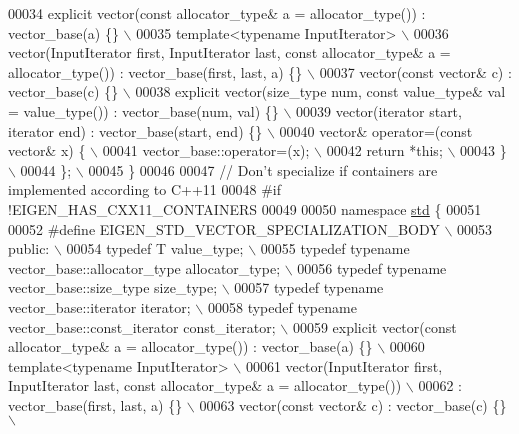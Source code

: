 \begin{DoxyCode}
00034 \textcolor{preprocessor}{    explicit vector(const allocator\_type& a = allocator\_type()) : vector\_base(a) \{\}  \(\backslash\)}
00035 \textcolor{preprocessor}{    template<typename InputIterator> \(\backslash\)}
00036 \textcolor{preprocessor}{    vector(InputIterator first, InputIterator last, const allocator\_type& a = allocator\_type()) :
       vector\_base(first, last, a) \{\} \(\backslash\)}
00037 \textcolor{preprocessor}{    vector(const vector& c) : vector\_base(c) \{\}  \(\backslash\)}
00038 \textcolor{preprocessor}{    explicit vector(size\_type num, const value\_type& val = value\_type()) : vector\_base(num, val) \{\} \(\backslash\)}
00039 \textcolor{preprocessor}{    vector(iterator start, iterator end) : vector\_base(start, end) \{\}  \(\backslash\)}
00040 \textcolor{preprocessor}{    vector& operator=(const vector& x) \{  \(\backslash\)}
00041 \textcolor{preprocessor}{      vector\_base::operator=(x);  \(\backslash\)}
00042 \textcolor{preprocessor}{      return *this;  \(\backslash\)}
00043 \textcolor{preprocessor}{    \} \(\backslash\)}
00044 \textcolor{preprocessor}{  \}; \(\backslash\)}
00045 \textcolor{preprocessor}{\}}
00046 
00047 \textcolor{comment}{// Don't specialize if containers are implemented according to C++11}
00048 \textcolor{preprocessor}{#if !EIGEN\_HAS\_CXX11\_CONTAINERS}
00049 
00050 \textcolor{keyword}{namespace }\hyperlink{namespacestd}{std} \{
00051 
00052 \textcolor{preprocessor}{#define EIGEN\_STD\_VECTOR\_SPECIALIZATION\_BODY \(\backslash\)}
00053 \textcolor{preprocessor}{  public:  \(\backslash\)}
00054 \textcolor{preprocessor}{    typedef T value\_type; \(\backslash\)}
00055 \textcolor{preprocessor}{    typedef typename vector\_base::allocator\_type allocator\_type; \(\backslash\)}
00056 \textcolor{preprocessor}{    typedef typename vector\_base::size\_type size\_type;  \(\backslash\)}
00057 \textcolor{preprocessor}{    typedef typename vector\_base::iterator iterator;  \(\backslash\)}
00058 \textcolor{preprocessor}{    typedef typename vector\_base::const\_iterator const\_iterator;  \(\backslash\)}
00059 \textcolor{preprocessor}{    explicit vector(const allocator\_type& a = allocator\_type()) : vector\_base(a) \{\}  \(\backslash\)}
00060 \textcolor{preprocessor}{    template<typename InputIterator> \(\backslash\)}
00061 \textcolor{preprocessor}{    vector(InputIterator first, InputIterator last, const allocator\_type& a = allocator\_type()) \(\backslash\)}
00062 \textcolor{preprocessor}{    : vector\_base(first, last, a) \{\} \(\backslash\)}
00063 \textcolor{preprocessor}{    vector(const vector& c) : vector\_base(c) \{\}  \(\backslash\)}

\end{DoxyCode}
